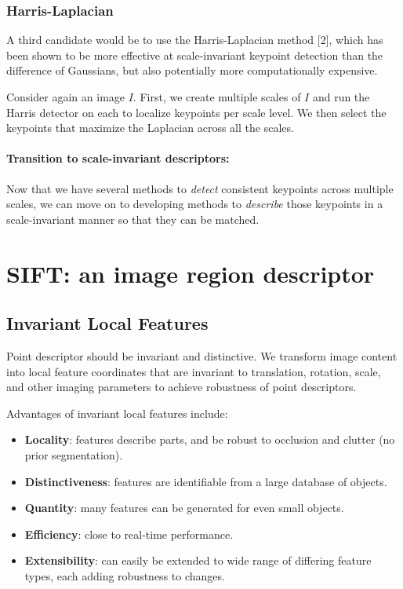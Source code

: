 \documentclass{article}
\begin{document}
\subsubsection{Harris-Laplacian}
A third candidate would be to use the Harris-Laplacian method [2], which has been shown to be more effective at scale-invariant keypoint detection than the difference of Gaussians, but also potentially more computationally expensive.

Consider again an image $I$. First, we create multiple scales of $I$ and run the Harris detector on each to localize keypoints per scale level. We then select the keypoints that maximize the Laplacian across all the scales.

\paragraph{Transition to scale-invariant descriptors:} Now that we have several methods to \textit{detect} consistent keypoints across multiple scales, we can move on to developing methods to \textit{describe} those keypoints in a scale-invariant manner so that they can be matched.

\section{SIFT: an image region descriptor}

\subsection{Invariant Local Features}
Point descriptor should be invariant and distinctive. We transform image content into local feature coordinates that are invariant to translation, rotation, scale, and other imaging parameters to achieve robustness of point descriptors.

Advantages of invariant local features include:
\begin{itemize}
  \item {\bf Locality}: features describe parts, and be robust to occlusion and clutter (no prior segmentation).
  \item {\bf Distinctiveness}: features are identifiable from a large database of objects.
  \item {\bf Quantity}: many features can be generated for even small objects.
  \item {\bf Efficiency}: close to real-time performance.
  \item {\bf Extensibility}: can easily be extended to wide range of differing feature types, each adding robustness to changes.
\end{itemize}
\end{document}

